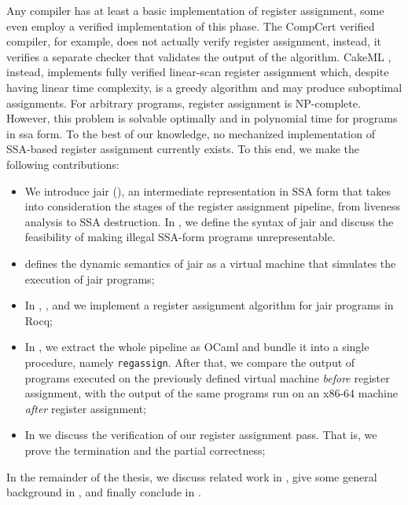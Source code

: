 Any compiler has at least a basic implementation of register assignment, some even employ a verified implementation of this phase. The CompCert \cite{Rideau-Leroy-regalloc} verified compiler, for example, does not actually verify register assignment, instead, it verifies a separate checker that validates the output of the algorithm. CakeML \cite{10.1145/2578855.2535841}, instead, implements fully verified linear-scan register assignment which, despite having linear time complexity, is a greedy algorithm and may produce suboptimal assignments.
For arbitrary programs, register assignment is NP-complete. However, this problem is solvable optimally and in polynomial time for programs in \gls{ssa} form.
To the best of our knowledge, no mechanized implementation of SSA-based register assignment currently exists. To this end, we make the following contributions:

\begin{itemize}
    \item We introduce \gls{jair} (), an intermediate representation in SSA form that takes into consideration the stages of the register assignment pipeline, from liveness analysis to SSA destruction. In , we define the syntax of \gls{jair} and discuss the feasibility of making illegal SSA-form programs unrepresentable.

    \item {} defines the dynamic semantics of \gls{jair} as a virtual machine that simulates the execution of \gls{jair} programs;

    \item In , , and  we implement a register assignment algorithm for \gls{jair} programs in Rocq;

    \item In , we extract the whole pipeline as OCaml and bundle it into a single procedure, namely \texttt{regassign}. After that, we compare the output of programs executed on the previously defined virtual machine \textit{before} register assignment, with the output of the same programs run on an x86-64 machine \textit{after} register assignment;

    \item In  we discuss the verification of our register assignment pass. That is, we prove the termination and the partial correctness;
\end{itemize}

In the remainder of the thesis, we discuss related work in , give some general background in , and finally conclude in .

